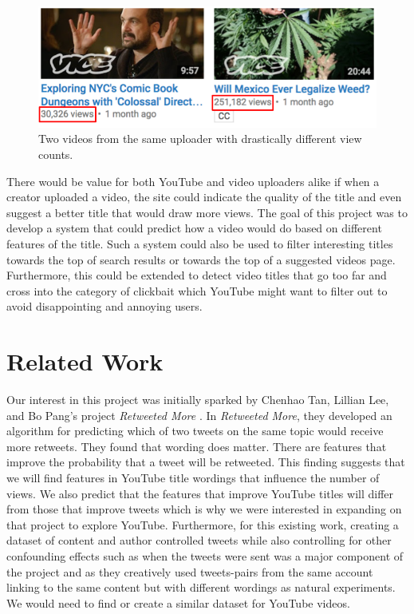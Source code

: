 \documentclass[a4paper,12pt]{article}
\begin{document}
\begin{figure}[h]
    \centering
    \includegraphics[width=.7\textwidth]{motivation}
    \caption{Two videos from the same uploader with drastically different view counts.}
    \label{fig:motivation}
\end{figure}

There would be value for both YouTube and video uploaders alike if when a creator uploaded a video, the site could indicate the quality of the title and even suggest a better title that would draw more views. The goal of this project was to develop a system that could predict how a video would do based on different features of the title. Such a system could also be used to filter interesting titles towards the top of search results or towards the top of a suggested videos page. Furthermore, this could be extended to detect video titles that go too far and cross into the category of clickbait which YouTube might want to filter out to avoid disappointing and annoying users.

\section{Related Work}
Our interest in this project was initially sparked by Chenhao Tan, Lillian Lee, and Bo Pang's project \textit{Retweeted More} \cite{tan+lee+pang:14}. In \textit{Retweeted More}, they developed an algorithm for predicting which of two tweets on the same topic would receive more retweets. They found that wording does matter. There are features that improve the probability that a tweet will be retweeted. This finding suggests that we will find features in YouTube title wordings that influence the number of views. We also predict that the features that improve YouTube titles will differ from those that improve tweets which is why we were interested in expanding on that project to explore YouTube. Furthermore, for this existing work, creating a dataset of content and author controlled tweets while also controlling for other confounding effects such as when the tweets were sent was a major component of the project and as they creatively used tweets-pairs from the same account linking to the same content but with different wordings as natural experiments. We would need to find or create a similar dataset for YouTube videos. \\
\end{document}
